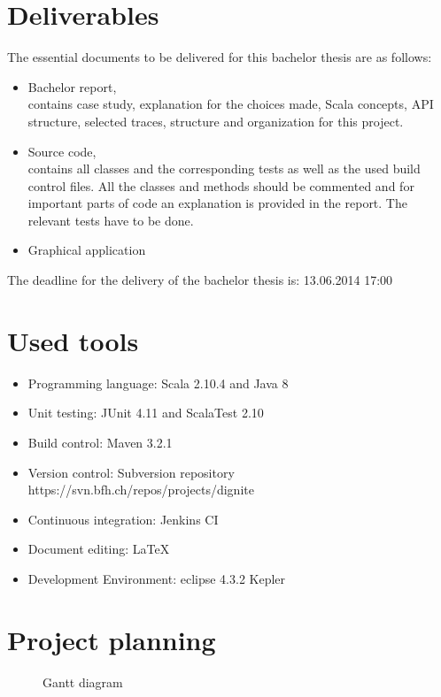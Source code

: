 \documentclass[
	a4paper,					10pt,							twoside,					openright,				notitlepage,			parskip=half,			]{scrreprt}
\begin{document}
\section{Deliverables}
\label{sec:intro_deliverables}
The essential documents to be delivered for this bachelor thesis are as follows:
\begin{itemize}
\item{Bachelor report, \\contains case study, explanation for the choices made, Scala concepts, \gls{API} structure, selected traces, structure and organization for this project.}
\item{Source code, \\contains all classes and the corresponding tests as well as the used build control files. All the classes and methods should be commented and for important parts of code an explanation is provided in the report. The relevant tests have to be done.}
\item{Graphical application}
\end{itemize}

The deadline for the delivery of the bachelor thesis is: 13.06.2014 17:00

\section{Used tools}
\label{sec:intro_tools}
\begin{itemize}
\item{Programming language: Scala 2.10.4 and Java 8}
\item{Unit testing: JUnit 4.11 and ScalaTest 2.10}
\item{Build control: Maven 3.2.1}
\item{Version control: Subversion repository https://svn.bfh.ch/repos/projects/dignite}
\item{Continuous integration: Jenkins \gls{CI}}
\item{Document editing: \LaTeX}
\item{Development Environment: eclipse 4.3.2 Kepler}
\end{itemize}

\section{Project planning}
\label{sec:intro_planning}

\begin{figure}[H] 
\caption{Gantt diagram}
\label{fig:gantt}
\end{figure}
\end{document}
